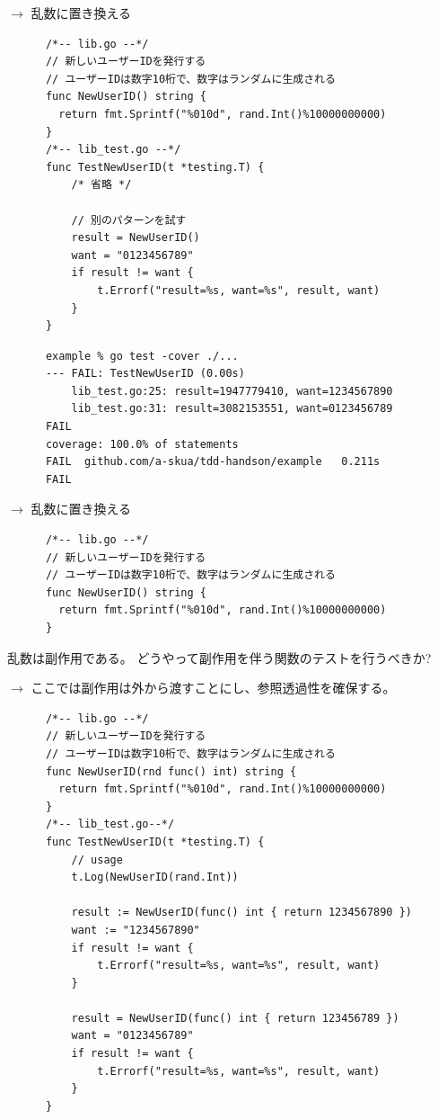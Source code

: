 \documentclass[aspectratio=169]{beamer}
\begin{document}
\begin{frame}[fragile]
  $\rightarrow$
  乱数に置き換える
  {
    \scriptsize
    \begin{verbatim}
      /*-- lib.go --*/
      // 新しいユーザーIDを発行する
      // ユーザーIDは数字10桁で、数字はランダムに生成される
      func NewUserID() string {
        return fmt.Sprintf("%010d", rand.Int()%10000000000)
      }
      /*-- lib_test.go --*/
      func TestNewUserID(t *testing.T) {
          /* 省略 */

          // 別のパターンを試す
          result = NewUserID()
          want = "0123456789"
          if result != want {
              t.Errorf("result=%s, want=%s", result, want)
          }
      }
    \end{verbatim}
  }
  {
    \color{gray}
    \scriptsize
    \begin{verbatim}
      example % go test -cover ./...
      --- FAIL: TestNewUserID (0.00s)
          lib_test.go:25: result=1947779410, want=1234567890
          lib_test.go:31: result=3082153551, want=0123456789
      FAIL
      coverage: 100.0% of statements
      FAIL	github.com/a-skua/tdd-handson/example	0.211s
      FAIL
    \end{verbatim}
  }
\end{frame}

\begin{frame}[fragile]
  $\rightarrow$
  乱数に置き換える
  {
    \scriptsize
    \begin{verbatim}
      /*-- lib.go --*/
      // 新しいユーザーIDを発行する
      // ユーザーIDは数字10桁で、数字はランダムに生成される
      func NewUserID() string {
        return fmt.Sprintf("%010d", rand.Int()%10000000000)
      }

    \end{verbatim}
  }
  乱数は副作用である。
  どうやって副作用を伴う関数のテストを行うべきか?
\end{frame}

\begin{frame}[fragile]
  $\rightarrow$
  ここでは副作用は外から渡すことにし、参照透過性を確保する。
  {
    \scriptsize
    \begin{verbatim}
      /*-- lib.go --*/
      // 新しいユーザーIDを発行する
      // ユーザーIDは数字10桁で、数字はランダムに生成される
      func NewUserID(rnd func() int) string {
        return fmt.Sprintf("%010d", rand.Int()%10000000000)
      }
      /*-- lib_test.go--*/
      func TestNewUserID(t *testing.T) {
          // usage
          t.Log(NewUserID(rand.Int))

          result := NewUserID(func() int { return 1234567890 })
          want := "1234567890"
          if result != want {
              t.Errorf("result=%s, want=%s", result, want)
          }

          result = NewUserID(func() int { return 123456789 })
          want = "0123456789"
          if result != want {
              t.Errorf("result=%s, want=%s", result, want)
          }
      }
    \end{verbatim}
  }
\end{frame}
\end{document}
